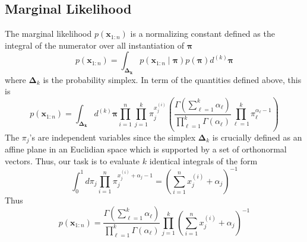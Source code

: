 \documentclass{article}
\numberwithin{equation}{section}
\begin{document}
\subsection{Marginal Likelihood}
 The marginal likelihood $p(\mathbf{x}_{1:n})$ 
is a normalizing constant defined as the 
integral of the numerator over all instantiation of $\bm{ \pi} $
\[
        p(\mathbf{x}_{1:n}) = \int_{\bm{ \Delta_k}} 
        p(\mathbf{x}_{1:n} \mid \bm{ \pi})  p(\bm{ \pi} )d^{(k)}\bm{ \pi}  
\]
where $\bm{ \Delta}_k $ is the probability simplex. In term of the quantities 
defined above, this is
\[
         p(\mathbf{x}_{1:n}) = \int_{\bm{ \Delta_k}} 
         d^{(k)}\bm{ \pi} 
        \prod_{i = 1}^n \prod_{j = 1}^k \pi_j^{x_j^{(i)}}
        \left( 
         \frac{\Gamma ( \sum _{\ell = 1}^k \alpha_\ell) }{\prod_{\ell=1}^k \Gamma(\alpha_\ell)} 
         \prod_{\ell = 1}^k \pi_\ell^{\alpha_\ell - 1}
        \right) 
\]
The $\pi_j$'s are independent variables since the simplex $\bm{ \Delta}_k $ is crucially 
defined as an affine plane in an Euclidian space which is supported by 
a set of orthonormal vectors.
Thus, our task is to evaluate $k$ identical integrals of the form
\[
        \int_0^1 d\pi_j \prod_{i = 1}^n \pi_j^{x_j^{(i)} + \alpha_j - 1}
        = 
        \left( \sum_{i = 1}^n x_j^{(i)} + \alpha_j \right)^{-1}
\]
Thus
\[
        \boxed{p(\mathbf{x}_{1:n}) = 
         \frac{\Gamma ( \sum _{\ell = 1}^k \alpha_\ell) }{\prod_{\ell=1}^k \Gamma(\alpha_\ell)} 
 \prod_{j = 1}^k\left( \sum_{i = 1}^n x_j^{(i)} + \alpha_j \right)^{-1}}
\]
\end{document}
